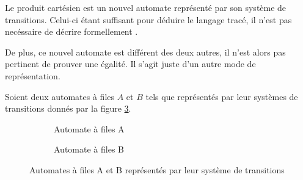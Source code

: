 Le produit cartésien est un nouvel automate représenté par son système de transitions. Celui-ci étant suffisant pour déduire le langage tracé, il n'est pas necéssaire de décrire formellement \fifo.

De plus, ce nouvel automate est différent des deux autres, il n'est alors pas pertinent de prouver une égalité. Il s'agit juste d'un autre mode de représentation.



\begin{example}
  Soient deux automates à files $A$ et $B$ tels que représentés par leur systèmes de transitions donnés par la figure \ref{fig:fifoAB}.

  \begin{figure}[H]
    \centering
    \begin{subfigure}{0.5\textwidth}
      \centering
      \caption{Automate à files A}
      \label{fig:fifoA}
      \end{subfigure}%
      \begin{subfigure}{0.5\textwidth}
        \centering
        \caption{Automate à files B}
        \label{fig:fifoB}
      \end{subfigure}
      \caption{Automates à files A et B représentés par leur système de transitions}
      \label{fig:fifoAB}
    \end{figure}


\end{example}
